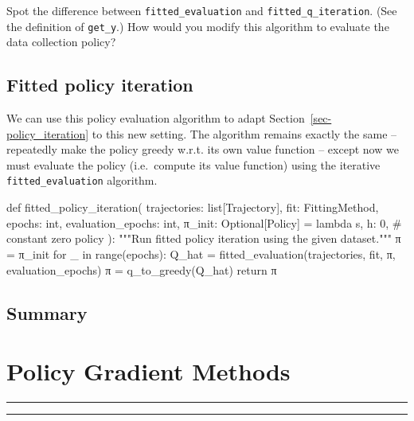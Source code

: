 \documentclass[
  letterpaper,
  DIV=11,
  numbers=noendperiod]{scrreprt}
\newenvironment{Shaded}{\begin{snugshade}}{\end{snugshade}}
\newcommand{\NormalTok}[1]{\textcolor[rgb]{0.00,0.23,0.31}{#1}}
\theoremstyle{plain}
\theoremstyle{plain}
\theoremstyle{definition}
\theoremstyle{definition}
\theoremstyle{remark}
\begin{document}
Spot the difference between \texttt{fitted\_evaluation} and
\texttt{fitted\_q\_iteration}. (See the definition of \texttt{get\_y}.)
How would you modify this algorithm to evaluate the data collection
policy?

\section{Fitted policy iteration}\label{fitted-policy-iteration}

We can use this policy evaluation algorithm to adapt
Section~\ref{sec-policy_iteration} to this new setting. The algorithm
remains exactly the same -- repeatedly make the policy greedy w.r.t. its
own value function -- except now we must evaluate the policy
(i.e.~compute its value function) using the iterative
\texttt{fitted\_evaluation} algorithm.

\begin{Shaded}
\begin{Highlighting}[]
\NormalTok{def fitted\_policy\_iteration(}
\NormalTok{    trajectories: list[Trajectory],}
\NormalTok{    fit: FittingMethod,}
\NormalTok{    epochs: int,}
\NormalTok{    evaluation\_epochs: int,}
\NormalTok{    π\_init: Optional[Policy] = lambda s, h: 0,  \# constant zero policy}
\NormalTok{):}
\NormalTok{    """Run fitted policy iteration using the given dataset."""}
\NormalTok{    π = π\_init}
\NormalTok{    for \_ in range(epochs):}
\NormalTok{        Q\_hat = fitted\_evaluation(trajectories, fit, π, evaluation\_epochs)}
\NormalTok{        π = q\_to\_greedy(Q\_hat)}
\NormalTok{    return π}
\end{Highlighting}
\end{Shaded}

\section{Summary}\label{summary-3}


\chapter{Policy Gradient Methods}\label{sec-pg}

\begin{center}\rule{0.5\linewidth}{0.5pt}\end{center}

\begin{center}\rule{0.5\linewidth}{0.5pt}\end{center}
\end{document}
